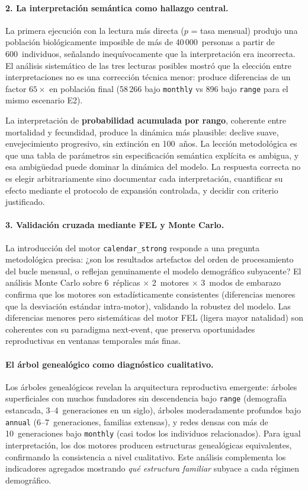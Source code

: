 \documentclass{llncs}
\begin{document}
\paragraph{2. La interpretación semántica como hallazgo central.}
La primera ejecución con la lectura más directa ($p$ = tasa mensual) produjo
una población biológicamente imposible de más de 40\,000~personas a partir
de 600~individuos, señalando inequívocamente que la interpretación era
incorrecta.
El análisis sistemático de las tres lecturas posibles mostró que la elección
entre interpretaciones no es una corrección técnica menor: produce diferencias
de un factor $65\times$ en población final
(58\,266 bajo \texttt{monthly} vs 896 bajo \texttt{range} para el mismo
escenario E2).

La interpretación de \textbf{probabilidad acumulada por rango}, coherente
entre mortalidad y fecundidad, produce la dinámica más plausible: declive
suave, envejecimiento progresivo, sin extinción en 100~años.
La lección metodológica es que una tabla de parámetros sin especificación
semántica explícita es ambigua, y esa ambigüedad puede dominar la dinámica
del modelo.
La respuesta correcta no es elegir arbitrariamente sino documentar cada
interpretación, cuantificar su efecto mediante el protocolo de expansión
controlada, y decidir con criterio justificado.

\paragraph{3. Validación cruzada mediante FEL y Monte Carlo.}
La introducción del motor \texttt{calendar\_strong} responde a una pregunta
metodológica precisa: ¿son los resultados artefactos del orden de
procesamiento del bucle mensual, o reflejan genuinamente el modelo
demográfico subyacente?
El análisis Monte Carlo sobre 6~réplicas $\times$ 2~motores $\times$
3~modos de embarazo confirma que los motores son estadísticamente
consistentes (diferencias menores que la desviación estándar intra-motor),
validando la robustez del modelo.
Las diferencias menores pero sistemáticas del motor FEL (ligera mayor
natalidad) son coherentes con su paradigma next-event, que preserva
oportunidades reproductivas en ventanas temporales más finas.

\paragraph{El árbol genealógico como diagnóstico cualitativo.}
Los árboles genealógicos revelan la arquitectura reproductiva emergente:
árboles superficiales con muchos fundadores sin descendencia bajo
\texttt{range} (demografía estancada, 3--4~generaciones en un siglo),
árboles moderadamente profundos bajo \texttt{annual} (6--7~generaciones,
familias extensas), y redes densas con más de 10~generaciones bajo
\texttt{monthly} (casi todos los individuos relacionados).
Para igual interpretación, los dos motores producen estructuras
genealógicas equivalentes, confirmando la consistencia a nivel cualitativo.
Este análisis complementa los indicadores agregados mostrando \emph{qué
estructura familiar} subyace a cada régimen demográfico.
\end{document}
